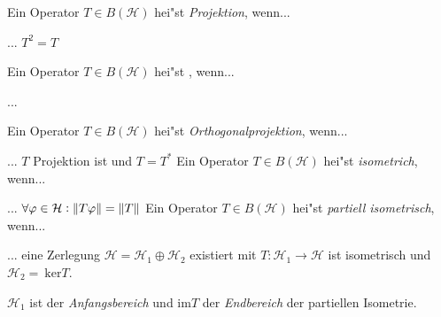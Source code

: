 \documentclass[9pt]{article}
\newcommand{\Hi}{\mathcal{H}}
\newenvironment{field}{}{\newpage}
\newif\ifnote
\newenvironment{note}{\notetrue}{\notefalse}
\begin{document}
\begin{note}
				\begin{field}  %
			Ein Operator $T\in B(\Hi)$ hei"st \textit{Projektion}, wenn...
		\end{field}
		
		\begin{field}  %
			... $T^2=T$
		\end{field}
	
				\begin{field}  %
			Ein Operator $T\in B(\Hi)$ hei"st \textit{}, wenn...
		\end{field}
		
		\begin{field}  %
			...
		\end{field}
	
				\begin{field}  %
			Ein Operator $T\in B(\Hi)$ hei"st \textit{Orthogonalprojektion}, wenn...
		\end{field}
		
		\begin{field}  %
			... $T$ Projektion ist und $T=T^*$
		\end{field}
		\begin{field}  %
			Ein Operator $T\in B(\Hi)$ hei"st \textit{isometrich}, wenn...
		\end{field}
	
		\begin{field}  %
			... $\forall \varphi \in \Hi: \norm{T\varphi} = \norm{T}$
		\end{field}
		\begin{field}  %
			Ein Operator $T\in B(\Hi)$ hei"st \textit{partiell isometrisch}, wenn...
		\end{field}

		\begin{field}  %
			... eine Zerlegung $\Hi = \Hi_1 \oplus \Hi_2$ existiert mit $T:\Hi_1\rightarrow\Hi$ ist isometrisch
			und $\Hi_2 = \ \text{ker}T$.
			
			$\Hi_1$ ist der \textit{Anfangsbereich}  und $\text{im}T$ der \textit{Endbereich} der partiellen Isometrie. 
		\end{field}
	\end{note}
\end{document}
